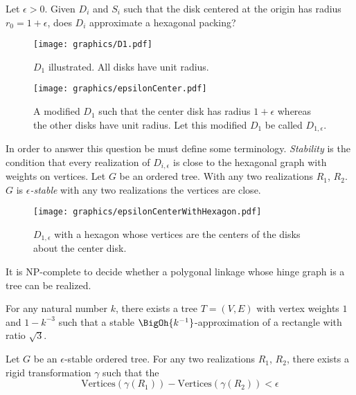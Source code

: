 \begin{prob}
Let $\epsilon > 0$.  Given $D_i$ and $S_i$ such that the disk centered at the origin has radius $r_0 = 1+\epsilon$, does $D_i$ approximate a hexagonal packing?
\end{prob}
\begin{figure}[!htbp]
\centering
\begin{minipage}{0.45\textwidth}
\centering
\texttt{[image: graphics/D1.pdf]}
\caption{$D_1$ illustrated.  All disks have unit radius.}\label{fig:D1}
\end{minipage}\hfill
\begin{minipage}{0.45\textwidth}
\centering
\texttt{[image: graphics/epsilonCenter.pdf]}
\caption{A modified $D_1$ such that the center disk has radius $1+\epsilon$ whereas the other disks have unit radius.  Let this modified $D_1$ be called $D_{1,\epsilon}$.}\label{fig:epsilonCenter}
\end{minipage}
\end{figure}
In order to answer this question be must define some terminology.  \textit{Stability} is the condition that every realization of $D_{i,\epsilon}$ is close to the hexagonal graph with weights on vertices.  Let $G$ be an ordered tree. With any two realizations $R_1$, $R_2$.  $G$ is \textit{$\epsilon$-stable} with any two realizations the vertices are close.
\begin{figure}[!htbp]
\begin{center}
\texttt{[image: graphics/epsilonCenterWithHexagon.pdf]}
\caption{$D_{1,\epsilon}$ with a hexagon whose vertices are the centers of the disks about the center disk.}\label{fig:epsilonCenterWithHexagon}
\end{center}
\end{figure}

\begin{thm}\label{thm:ContactGraphV3-1}
It is NP-complete to decide whether a polygonal linkage whose hinge graph is a tree can be realized.
\end{thm}
 
\begin{lem}\label{lem:ContactGraphV3-1}
For any natural number $k$,  there exists a tree $T = (V,E)$ with vertex weights $1$ and $1 - k^{-3}$ such that a stable $\BigOh{k^{-1}}$-approximation of a rectangle with ratio $\sqrt{3}$.
\end{lem}

\begin{thm}
 Let $G$ be an $\epsilon$-stable ordered tree. For any two realizations $R_1$, $R_2$, there exists a rigid transformation $\gamma$ such that the $$\text{Vertices}\left(\gamma\left(R_1 \right)\right) - \text{Vertices}\left(\gamma\left(R_2\right)\right) < \epsilon$$
\end{thm}

